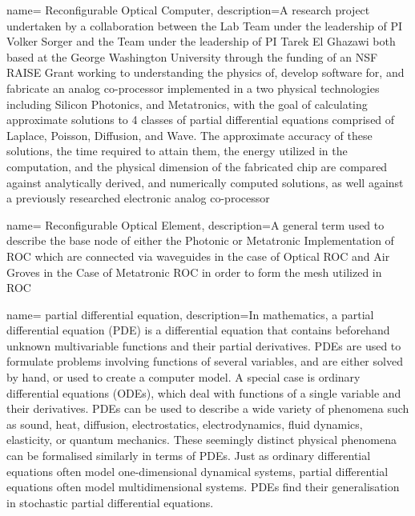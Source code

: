 {
        name= Reconfigurable Optical Computer,
        description={A research project undertaken by a collaboration between the  Lab Team under the leadership of PI Volker Sorger and the  Team under the leadership of PI Tarek El Ghazawi both based at the George Washington University through the funding of an NSF RAISE Grant working to understanding the physics of, develop software for, and fabricate an analog co-processor implemented in a two physical technologies including Silicon Photonics, and Metatronics, with the goal of calculating approximate solutions to 4 classes of partial differential equations comprised of Laplace, Poisson, Diffusion, and Wave. The approximate accuracy of these solutions, the time required to attain them, the energy utilized in the computation, and the physical dimension of the fabricated chip are compared against analytically derived, and numerically computed solutions, as well against a previously researched electronic analog co-processor}
}

{
        name= Reconfigurable Optical Element,
        description={A general term used to describe the base node of either the Photonic or Metatronic Implementation of ROC which are connected via waveguides in the case of Optical ROC and Air Groves in the Case of Metatronic ROC in order to form the mesh utilized in ROC}
}



{
        name= partial differential equation,
        description={In mathematics, a partial differential equation (PDE) is a differential equation that contains beforehand unknown multivariable functions and their partial derivatives. PDEs are used to formulate problems involving functions of several variables, and are either solved by hand, or used to create a computer model. A special case is ordinary differential equations (ODEs), which deal with functions of a single variable and their derivatives. PDEs can be used to describe a wide variety of phenomena such as sound, heat, diffusion, electrostatics, electrodynamics, fluid dynamics, elasticity, or quantum mechanics. These seemingly distinct physical phenomena can be formalised similarly in terms of PDEs. Just as ordinary differential equations often model one-dimensional dynamical systems, partial differential equations often model multidimensional systems. PDEs find their generalisation in stochastic partial differential equations.}
}

